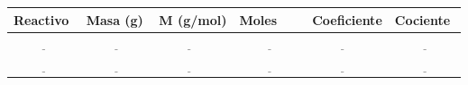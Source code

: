 \documentclass[
  spanish,
  letterpaper,
  12pt,
  oneside,
  open=any]{scrbook}
\newcounter{none} %
\begin{document}
{\def\LTcaptype{none} %
\begin{longtable}[]{@{}
  >{\raggedright\arraybackslash}p{}
  >{\raggedright\arraybackslash}p{}
  >{\raggedright\arraybackslash}p{}
  >{\raggedright\arraybackslash}p{}
  >{\raggedright\arraybackslash}p{}
  >{\raggedright\arraybackslash}p{}@{}}
\toprule\noalign{}
\begin{minipage}[b]{\linewidth}\raggedright
Reactivo
\end{minipage} & \begin{minipage}[b]{\linewidth}\raggedright
Masa (g)
\end{minipage} & \begin{minipage}[b]{\linewidth}\raggedright
M (g/mol)
\end{minipage} & \begin{minipage}[b]{\linewidth}\raggedright
Moles
\end{minipage} & \begin{minipage}[b]{\linewidth}\raggedright
Coeficiente
\end{minipage} & \begin{minipage}[b]{\linewidth}\raggedright
Cociente
\end{minipage} \\
\midrule\noalign{}
\endhead
\bottomrule\noalign{}
\endlastfoot
\(\underline{\hspace{2cm}}\) & \(\underline{\hspace{2cm}}\) &
\(\underline{\hspace{2cm}}\) & \(\underline{\hspace{2cm}}\) &
\(\underline{\hspace{2cm}}\) & \(\underline{\hspace{2cm}}\) \\
\(\underline{\hspace{2cm}}\) & \(\underline{\hspace{2cm}}\) &
\(\underline{\hspace{2cm}}\) & \(\underline{\hspace{2cm}}\) &
\(\underline{\hspace{2cm}}\) & \(\underline{\hspace{2cm}}\) \\
\end{longtable}
}
\end{document}
